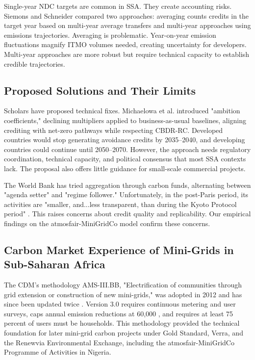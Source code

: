Single-year NDC targets are common in SSA. They create accounting risks. Siemons and Schneider \cite{siemons-accounting} compared two approaches: averaging counts credits in the target year based on multi-year average transfers and multi-year approaches using emissions trajectories. Averaging is problematic. Year-on-year emission fluctuations magnify ITMO volumes needed, creating uncertainty for developers. Multi-year approaches are more robust but require technical capacity to establish credible trajectories.

\subsection{Proposed Solutions and Their Limits}
\label{sec:lit-solutions}
Scholars have proposed technical fixes. Michaelowa et al. \cite{michaelowa-towards} introduced "ambition coefficients," declining multipliers applied to business-as-usual baselines, aligning crediting with net-zero pathways while respecting CBDR-RC. Developed countries would stop generating avoidance credits by 2035–2040, and developing countries could continue until 2050–2070. However, the approach needs regulatory coordination, technical capacity, and political consensus that most SSA contexts lack. The proposal also offers little guidance for small-scale commercial projects.

The World Bank has tried aggregation through carbon funds, alternating between "agenda setter" and "regime follower." Unfortunately, in the post-Paris period, its activities are "smaller, and...less transparent, than during the Kyoto Protocol period" \cite{michaelowa-catalysing}. This raises concerns about credit quality and replicability. Our empirical findings on the atmosfair-MiniGridCo model confirm these concerns.

\subsection{Carbon Market Experience of Mini-Grids in Sub-Saharan Africa}
The CDM's methodology AMS-III.BB, "Electrification of communities through grid extension or construction of new mini-grids," was adopted in 2012 and has since been updated twice \cite{unfccc-ams-iii-bb}. Version 3.0 requires continuous metering and user surveys, caps annual emission reductions at 60,000 \tcooe, and requires at least 75 percent of users must be households. This methodology provided the technical foundation for later mini-grid carbon projects under Gold Standard, Verra, and the Renewvia Environmental Exchange, including the atmosfair-MiniGridCo Programme of Activities in Nigeria.

